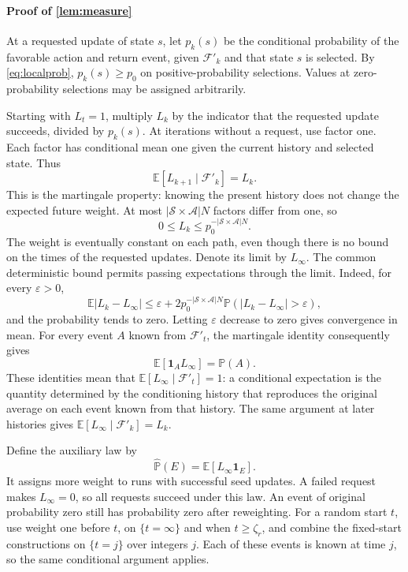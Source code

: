 \paragraph{Proof of \autoref{lem:measure}}
At a requested update of state $s$, let $p_k(s)$ be the conditional probability of the favorable action and return event, given $\mathcal F'_k$ and that state $s$ is selected. By \eqref{eq:localprob}, $p_k(s)\ge p_0$ on positive-probability selections. Values at zero-probability selections may be assigned arbitrarily.

Starting with $L_t=1$, multiply $L_k$ by the indicator that the requested update succeeds, divided by $p_k(s)$. At iterations without a request, use factor one. Each factor has conditional mean one given the current history and selected state. Thus
\[
\mathbb E[L_{k+1}\mid\mathcal F'_k]=L_k.
\]
This is the martingale property: knowing the present history does not change the expected future weight. At most $|\mathcal S\times\mathcal A|N$ factors differ from one, so
\[
0\le L_k\le p_0^{-|\mathcal S\times\mathcal A|N}.
\]
The weight is eventually constant on each path, even though there is no bound on the times of the requested updates. Denote its limit by $L_\infty$. The common deterministic bound permits passing expectations through the limit. Indeed, for every $\varepsilon>0$,
\[
\mathbb E|L_k-L_\infty|
\le\varepsilon+2p_0^{-|\mathcal S\times\mathcal A|N}
\mathbb P(|L_k-L_\infty|>\varepsilon),
\]
and the probability tends to zero. Letting $\varepsilon$ decrease to zero gives convergence in mean.
For every event $A$ known from $\mathcal F'_t$, the martingale identity consequently gives
\[
\mathbb E[\mathbf1_A L_\infty]=\mathbb P(A).
\]
These identities mean that $\mathbb E[L_\infty\mid\mathcal F'_t]=1$: a conditional expectation is the quantity determined by the conditioning history that reproduces the original average on each event known from that history. The same argument at later histories gives $\mathbb E[L_\infty\mid\mathcal F'_k]=L_k$.

Define the auxiliary law by
\[
\widehat{\mathbb P}(E)=\mathbb E[L_\infty\mathbf1_E].
\]
It assigns more weight to runs with successful seed updates. A failed request makes $L_\infty=0$, so all requests succeed under this law. An event of original probability zero still has probability zero after reweighting.
For a random start $t$, use weight one before $t$, on $\{t=\infty\}$ and when $t\ge\zeta_r$, and combine the fixed-start constructions on $\{t=j\}$ over integers $j$. Each of these events is known at time $j$, so the same conditional argument applies.

